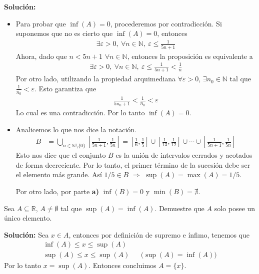 \documentclass[12pt]{book}
\begin{document}
\textbf{Solución:}
\begin{itemize}
    \item[\textbf{a)}] Para probar que $\inf(A)=0$, procederemos por contradicción. Si suponemos que no es cierto que $\inf(A)=0$, entonces 
    \begin{align*}
        \exists \varepsilon >0, \ \forall n \in \mathbb{N}, \ \varepsilon \leq \frac{1}{5n+1}
    \end{align*}
    Ahora, dado que $n < 5n+1$ $\forall n \in \mathbb{N}$, entonces la proposición es equivalente a
    \begin{align*}
       \exists \varepsilon >0, \    \forall n \in \mathbb{N}, \ \varepsilon \leq \frac{1}{5n+1} < \frac{1}{n}
    \end{align*}
    Por otro lado, utilizando la propiedad arquimediana $\forall \varepsilon >0$, $\exists n_0 \in \mathbb{N}$ tal que $ \displaystyle\frac{1}{n_0} <\varepsilon$. Esto garantiza que 
    \begin{align*}
        \frac{1}{5n_0 +1 } <\frac{1}{n_0} < \varepsilon
    \end{align*}
    Lo cual es una contradicción. Por lo tanto $\inf(A)=0$.
    

    \item[\textbf{b)}] Analicemos lo que nos dice la notación.
    \begin{align*}
        B&= \bigcup_{n \in \mathbb{N}\setminus \{0\}} \left[\frac{1}{5n+1}, \frac{1}{5n} \right]= \left[\frac{1}{6}, \frac{1}{5} \right] \cup  \left[\frac{1}{13}, \frac{1}{12} \right] \cup  \cdots  \cup \left[\frac{1}{5n+1}, \frac{1}{5n} \right]
    \end{align*}
    Esto nos dice que el conjunto $B$ es la unión de intervalos  cerrados y acotados de forma decreciente. Por lo tanto, el primer término de la sucesión debe ser el elemento más grande. Así $1/5 \in B$ $\Longrightarrow$ $\sup(A)=\max(A)=1/5$. 

     
    Por otro lado, por parte \textbf{a)} $\inf(B)=0$ y $\min(B)= \nexists$.
\end{itemize}
\begin{prob}{}{}
    Sea $A \subseteq \mathbb{R}$, $A\neq \emptyset$ tal que $\sup(A)=\inf(A)$. Demuestre que $A$ solo posee un único elemento.
\end{prob}
\textbf{Solución:}
Sea $x \in A$, entonces por definición de supremo e ínfimo, tenemos que 
\begin{align*}
    \inf(A) \leq x \leq \sup(A) \\
    \sup(A) \leq x \leq \sup(A) && \textbf{($\sup(A)= \inf(A)$)}
\end{align*}
Por lo tanto $x= \sup(A)$. Entonces concluimos $A=\{x\}$.
\end{document}
